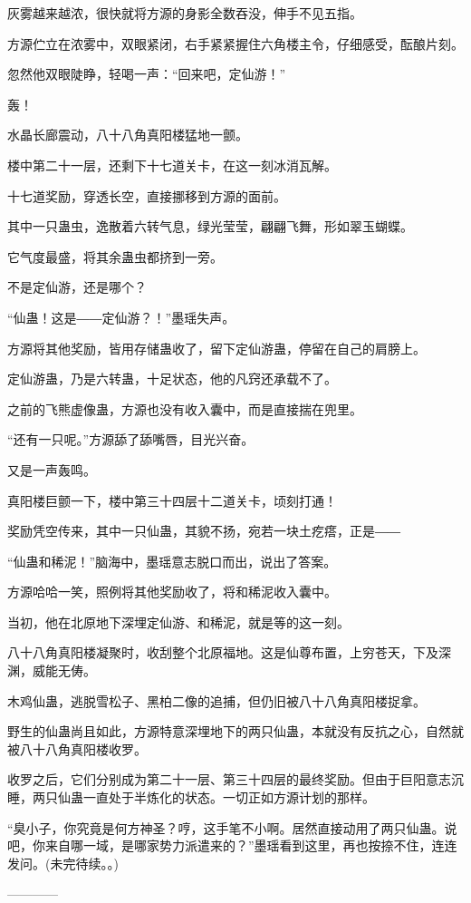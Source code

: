 \begin{this_body}
灰雾越来越浓，很快就将方源的身影全数吞没，伸手不见五指。

方源伫立在浓雾中，双眼紧闭，右手紧紧握住六角楼主令，仔细感受，酝酿片刻。

忽然他双眼陡睁，轻喝一声：“回来吧，定仙游！”

轰！

水晶长廊震动，八十八角真阳楼猛地一颤。

楼中第二十一层，还剩下十七道关卡，在这一刻冰消瓦解。

十七道奖励，穿透长空，直接挪移到方源的面前。

其中一只蛊虫，逸散着六转气息，绿光莹莹，翩翩飞舞，形如翠玉蝴蝶。

它气度最盛，将其余蛊虫都挤到一旁。

不是定仙游，还是哪个？

“仙蛊！这是――定仙游？！”墨瑶失声。

方源将其他奖励，皆用存储蛊收了，留下定仙游蛊，停留在自己的肩膀上。

定仙游蛊，乃是六转蛊，十足状态，他的凡窍还承载不了。

之前的飞熊虚像蛊，方源也没有收入囊中，而是直接揣在兜里。

“还有一只呢。”方源舔了舔嘴唇，目光兴奋。

又是一声轰鸣。

真阳楼巨颤一下，楼中第三十四层十二道关卡，顷刻打通！

奖励凭空传来，其中一只仙蛊，其貌不扬，宛若一块土疙瘩，正是――

“仙蛊和稀泥！”脑海中，墨瑶意志脱口而出，说出了答案。

方源哈哈一笑，照例将其他奖励收了，将和稀泥收入囊中。

当初，他在北原地下深埋定仙游、和稀泥，就是等的这一刻。

八十八角真阳楼凝聚时，收刮整个北原福地。这是仙尊布置，上穷苍天，下及深渊，威能无俦。

木鸡仙蛊，逃脱雪松子、黑柏二像的追捕，但仍旧被八十八角真阳楼捉拿。

野生的仙蛊尚且如此，方源特意深埋地下的两只仙蛊，本就没有反抗之心，自然就被八十八角真阳楼收罗。

收罗之后，它们分别成为第二十一层、第三十四层的最终奖励。但由于巨阳意志沉睡，两只仙蛊一直处于半炼化的状态。一切正如方源计划的那样。

“臭小子，你究竟是何方神圣？哼，这手笔不小啊。居然直接动用了两只仙蛊。说吧，你来自哪一域，是哪家势力派遣来的？”墨瑶看到这里，再也按捺不住，连连发问。(未完待续。。)

------------

\end{this_body}

